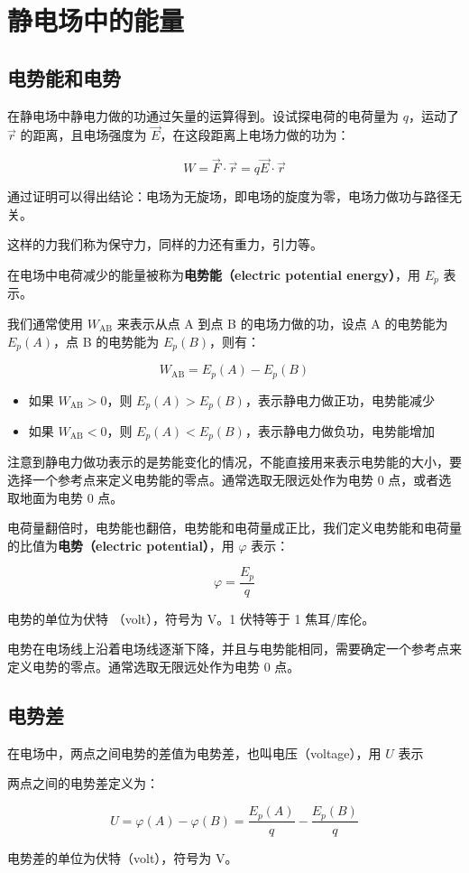 \documentclass[lang=cn,newtx,10pt,scheme=chinese]{elegantbook}
\begin{document}
\chapter{静电场中的能量}

\section{电势能和电势}

在静电场中静电力做的功通过矢量的运算得到。设试探电荷的电荷量为 $q$，运动了 $\vec{r}$ 的距离，且电场强度为 $\vec{E}$，在这段距离上电场力做的功为：

$$
W = \vec{F} \cdot \vec{r} = q\vec{E} \cdot \vec{r}
$$

\begin{lemma}
  通过证明可以得出结论：电场为无旋场，即电场的旋度为零，电场力做功与路径无关。
  
  这样的力我们称为保守力，同样的力还有重力，引力等。
\end{lemma}

\begin{definition}
  在电场中电荷减少的能量被称为\textbf{电势能（electric potential energy）}，用 $E_p$ 表示。
\end{definition}

我们通常使用 $W_{\text{AB}}$ 来表示从点 A 到点 B 的电场力做的功，设点 A 的电势能为 $E_p(A)$，点 B 的电势能为 $E_p(B)$，则有：

$$
W_{\text{AB}} = E_p(A) - E_p(B)
$$

\begin{itemize}
  \item 如果 $W_{\text{AB}} > 0$，则 $E_p(A) > E_p(B)$，表示静电力做正功，电势能减少
  \item 如果 $W_{\text{AB}} < 0$，则 $E_p(A) < E_p(B)$，表示静电力做负功，电势能增加
\end{itemize}

注意到静电力做功表示的是势能变化的情况，不能直接用来表示电势能的大小，要选择一个参考点来定义电势能的零点。通常选取无限远处作为电势 $0$ 点，或者选取地面为电势 $0$ 点。

电荷量翻倍时，电势能也翻倍，电势能和电荷量成正比，我们定义电势能和电荷量的比值为\textbf{电势（electric potential）}，用 $\varphi$ 表示：

$$
\varphi = \frac{E_p}{q}
$$

电势的单位为伏特 （volt），符号为 V。1 伏特等于 1 焦耳/库伦。

电势在电场线上沿着电场线逐渐下降，并且与电势能相同，需要确定一个参考点来定义电势的零点。通常选取无限远处作为电势 $0$ 点。

\section{电势差}

在电场中，两点之间电势的差值为电势差，也叫电压（voltage），用 $U$ 表示

\begin{definition}
  两点之间的电势差定义为：

  $$
  U = \varphi(A) - \varphi(B) = \frac{E_p(A)}{q} - \frac{E_p(B)}{q}
  $$

  电势差的单位为伏特（volt），符号为 V。
\end{definition}
\end{document}
